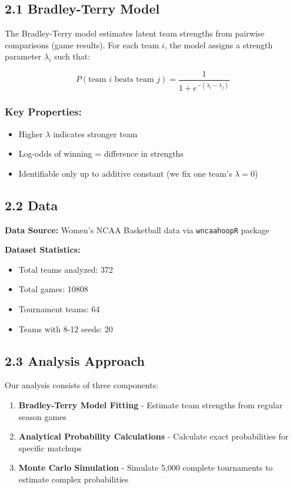 \documentclass[
]{article}
\providecommand{\tightlist}{%
  \setlength{\itemsep}{0pt}\setlength{\parskip}{0pt}}
\begin{document}
\subsection{2.1 Bradley-Terry Model}\label{bradley-terry-model}

The Bradley-Terry model estimates latent team strengths from pairwise
comparisons (game results). For each team \(i\), the model assigns a
strength parameter \(\lambda_i\) such that:

\[P(\text{team } i \text{ beats team } j) = \frac{1}{1 + e^{-(\lambda_i - \lambda_j)}}\]

\subsubsection{Key Properties:}\label{key-properties}

\begin{itemize}
\tightlist
\item
  Higher \(\lambda\) indicates stronger team
\item
  Log-odds of winning = difference in strengths
\item
  Identifiable only up to additive constant (we fix one team's
  \(\lambda = 0\))
\end{itemize}

\subsection{2.2 Data}\label{data}

\textbf{Data Source:} Women's NCAA Basketball data via
\texttt{wncaahoopR} package

\textbf{Dataset Statistics:}

\begin{itemize}
\tightlist
\item
  Total teams analyzed: 372
\item
  Total games: 10808
\item
  Tournament teams: 64
\item
  Teams with 8-12 seeds: 20
\end{itemize}

\subsection{2.3 Analysis Approach}\label{analysis-approach}

Our analysis consists of three components:

\begin{enumerate}
\def\labelenumi{\arabic{enumi}.}
\tightlist
\item
  \textbf{Bradley-Terry Model Fitting} - Estimate team strengths from
  regular season games
\item
  \textbf{Analytical Probability Calculations} - Calculate exact
  probabilities for specific matchups
\item
  \textbf{Monte Carlo Simulation} - Simulate 5,000 complete tournaments
  to estimate complex probabilities
\end{enumerate}
\end{document}

